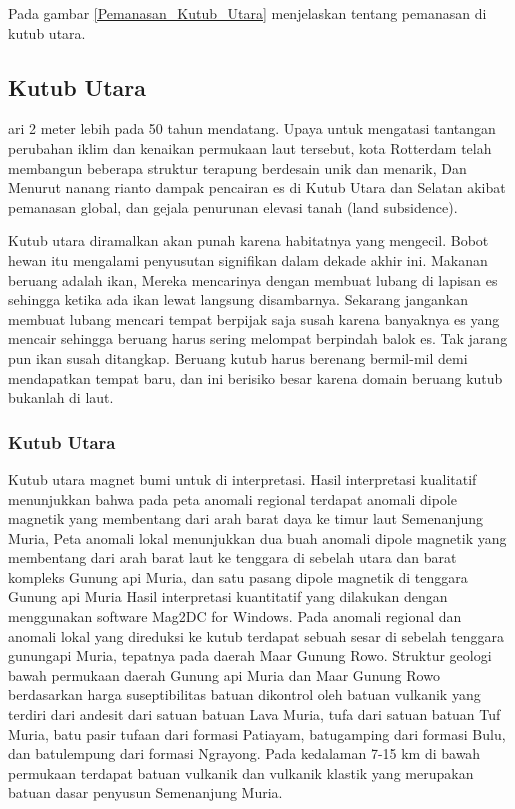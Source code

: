 Pada gambar \ref{Pemanasan_Kutub_Utara} menjelaskan tentang pemanasan di kutub utara.

\subsection	{Kutub Utara}	ari 2 meter lebih pada 50 tahun 
	mendatang. Upaya untuk mengatasi tantangan perubahan iklim dan kenaikan permukaan laut tersebut, kota Rotterdam telah membangun beberapa struktur terapung 
	berdesain unik dan menarik, Dan Menurut nanang rianto dampak pencairan es di Kutub Utara dan Selatan akibat pemanasan global, dan gejala penurunan elevasi
	tanah (land subsidence).
	
		Kutub utara diramalkan akan punah karena habitatnya yang mengecil. Bobot hewan itu mengalami penyusutan signifikan dalam dekade
	akhir ini. Makanan beruang adalah ikan, Mereka mencarinya dengan membuat lubang di lapisan es sehingga ketika ada ikan lewat langsung disambarnya. Sekarang 
	jangankan membuat lubang mencari tempat berpijak saja susah karena banyaknya es yang mencair sehingga beruang harus sering melompat berpindah balok es.
	Tak jarang pun ikan susah ditangkap. Beruang kutub harus berenang bermil-mil demi mendapatkan tempat baru, dan ini berisiko besar karena domain beruang
	kutub bukanlah di laut.
	
	
\subsubsection {Kutub Utara}
		Kutub utara magnet bumi untuk di interpretasi. Hasil interpretasi kualitatif menunjukkan bahwa pada peta anomali regional terdapat anomali dipole magnetik
	yang membentang dari arah barat daya ke timur laut Semenanjung Muria, Peta anomali lokal menunjukkan dua buah anomali dipole magnetik yang membentang dari 
	arah barat laut ke tenggara di sebelah utara dan barat kompleks Gunung api Muria, dan satu pasang dipole magnetik di tenggara Gunung api Muria Hasil 
	interpretasi kuantitatif yang dilakukan dengan menggunakan software Mag2DC for Windows. Pada anomali regional dan anomali lokal yang direduksi ke kutub 
	terdapat sebuah sesar di sebelah tenggara gunungapi Muria, tepatnya pada daerah Maar Gunung Rowo. Struktur geologi bawah permukaan daerah Gunung api Muria 
	dan Maar Gunung Rowo berdasarkan harga suseptibilitas batuan dikontrol oleh batuan vulkanik yang terdiri dari andesit dari satuan batuan Lava Muria, tufa 
	dari satuan batuan Tuf Muria, batu pasir tufaan dari formasi Patiayam, batugamping dari formasi Bulu, dan batulempung dari formasi Ngrayong. Pada kedalaman
	7-15 km di bawah permukaan terdapat batuan vulkanik dan vulkanik klastik yang merupakan batuan dasar penyusun Semenanjung Muria.
	
